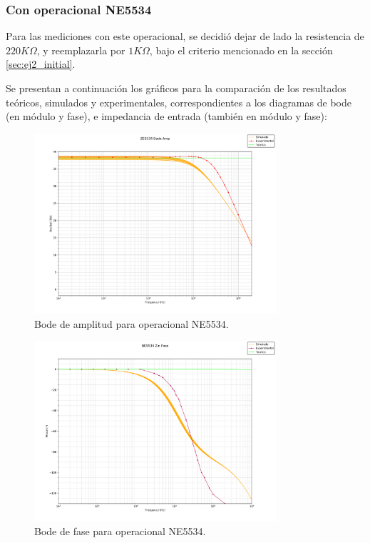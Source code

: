 \subsubsection{Con operacional NE5534}
Para las mediciones con este operacional, se decidió dejar de lado la resistencia de $220K\Omega$, y reemplazarla por $1K\Omega$, bajo el criterio mencionado en la sección \ref{sec:ej2_initial}. \par
Se presentan a continuación los gráficos para la comparación de los resultados teóricos, simulados y experimentales, correspondientes a los diagramas de bode (en módulo y fase), e impedancia de entrada (también en módulo y fase):
\begin{figure}[H]
    \begin{minipage}{\textwidth}
        \centering
        \includegraphics[width=0.8\textwidth]{../EJ2/recursos_para_el_informe/NE5534_Bode_Amp}
        \caption{Bode de amplitud para operacional NE5534.}
        \label{fig:NE5534_Bode_Amp}
    \end{minipage}\hfill
\end{figure}
\begin{figure}[H]
    \begin{minipage}{\textwidth}
        \centering
        \includegraphics[width=0.8\textwidth]{../EJ2/recursos_para_el_informe/NE5534_Bode_Fase}
        \caption{Bode de fase para operacional NE5534.}
        \label{fig:NE5534_Bode_Fase}
    \end{minipage}\hfill
\end{figure}

